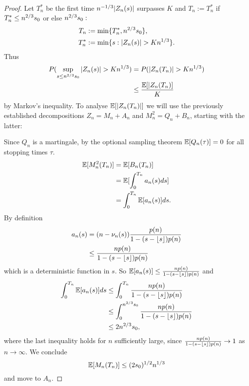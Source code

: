 \begin{proof}
    Let $T^*_n$ be the first time $n^{-1 / 3}|Z_n(s)|$ surpasses $K$ and  
    $T_n := T^*_n$ 
    if 
    $T^*_n \leq n^{2 / 3}s_0$
    or else
    $n^{2 / 3}s_0:$
    \begin{align*}
    T_n &:= \min \lbrace T^*_n, n^{2 / 3}s_0 \rbrace , \\
    T^*_n &:= \min \lbrace s: |Z_n(s)| > K n^{1 / 3} \rbrace .
    \end{align*}
    Thus 
    \begin{equation} \label{E: stoch bounded 2}
    \begin{aligned}
    P( \sup_{s\leq n^{2/3} s_0} |Z_n(s)| > K n^{1 / 3} ) &= P ( |Z_n(T_n)| > Kn^{1 / 3} ) \\
    &\leq \frac{\mathbb{E}[|Z_n(T_n)]}{K}
    \end{aligned} 
    \end{equation}
    by Markov's inequality.
    To analyse $\mathbb{E}[|Z_n(T_n)|]$ we will use the previously established decompositions
    $Z_n = M_n + A_n$ and $M^2_n = Q_n + B_n$, 
    starting with the latter:
    
    Since $Q_n$ is a martingale, by the optional sampling theorem
    $\mathbb{E}[Q_n(\tau)] = 0$ 
    for all stopping times $\tau$.
    \begin{align*}
    \mathbb{E}[M^2_n(T_n)] &= \mathbb{E}[B_n(T_n)] \\
    &= \mathbb{E}[ \int_{0}^{T_n} a_n(s)ds ] \\
    &= \int_{0}^{T_n} \mathbb{E}[a_n(s)] ds.
    \end{align*} 
    By definition
    \begin{align*}
    a_n(s) &= (n - \nu_n(s)) \frac{p(n)}{1 - (s - \lfloor s\rfloor)p(n)} \\
    &\leq \frac{n p(n)}{1 - (s - \lfloor s\rfloor)p(n)}
    \end{align*}
    which is a deterministic function in $s$. So
    $ \mathbb{E}[a_n(s)] \leq \frac{n p(n)}{1 - (s - \lfloor s\rfloor)p(n)} $
    and
    \begin{align*}
    \int_{0}^{T_n} \mathbb{E}[a_n(s)] ds &\leq  \int_{0}^{T_n }\frac{n p(n)}{1 - (s - \lfloor s\rfloor)p(n)} \\
    &\leq \int_{0}^{n^{2 / 3}s_0}\frac{n p(n)}{1 - (s - \lfloor s\rfloor)p(n)} \\
    &\leq 2n^{2 / 3}s_0,
    \end{align*}
    where the last inequality holds for $n$ sufficiently large, since 
    $\frac{n p(n)}{1 - (s - \lfloor s\rfloor)p(n)} \rightarrow 1$
    as $n \rightarrow \infty$.
    We conclude
    \begin{equation} \label{E: exp Mn}
    \mathbb{E}[M_n(T_n)] \leq (2s_0)^{1/2}n^{1 / 3}
    \end{equation}
    and move to $A_n$.
    

\end{proof}
